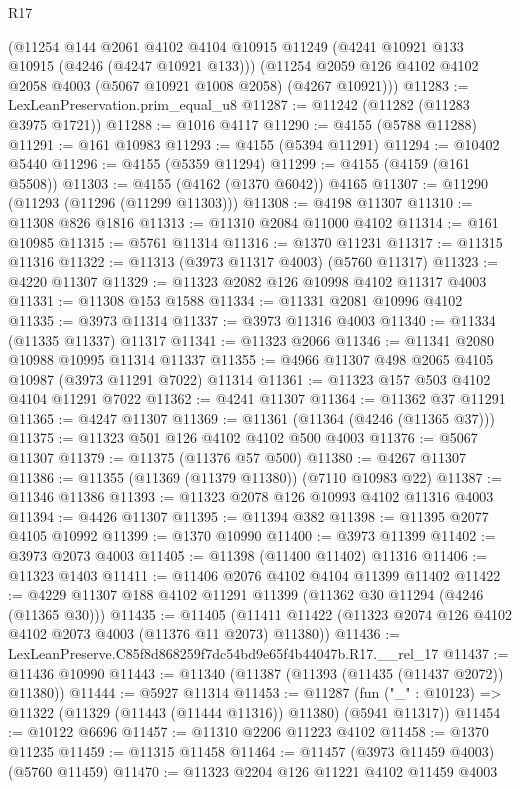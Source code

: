 \begin{lexlean}{R17}
\begin{coremodule}
    (@11254
      @144
      @2061
      @4102
      @4104
      @10915
      @11249
      (@4241 @10921 @133 @10915 (@4246 (@4247 @10921 @133)))
      (@11254 @2059 @126 @4102 @4102 @2058 @4003 (@5067 @10921 @1008 @2058) (@4267 @10921)))
@11283 := LexLeanPreservation.prim_equal_u8
@11287 := @11242 (@11282 (@11283 @3975 @1721))
@11288 := @1016 @4117
@11290 := @4155 (@5788 @11288)
@11291 := @161 @10983
@11293 := @4155 (@5394 @11291)
@11294 := @10402 @5440
@11296 := @4155 (@5359 @11294)
@11299 := @4155 (@4159 (@161 @5508))
@11303 := @4155 (@4162 (@1370 @6042)) @4165
@11307 := @11290 (@11293 (@11296 (@11299 @11303)))
@11308 := @4198 @11307
@11310 := @11308 @826 @1816
@11313 := @11310 @2084 @11000 @4102
@11314 := @161 @10985
@11315 := @5761 @11314
@11316 := @1370 @11231
@11317 := @11315 @11316
@11322 := @11313 (@3973 @11317 @4003) (@5760 @11317)
@11323 := @4220 @11307
@11329 := @11323 @2082 @126 @10998 @4102 @11317 @4003
@11331 := @11308 @153 @1588
@11334 := @11331 @2081 @10996 @4102
@11335 := @3973 @11314
@11337 := @3973 @11316 @4003
@11340 := @11334 (@11335 @11337) @11317
@11341 := @11323 @2066
@11346 := @11341 @2080 @10988 @10995 @11314 @11337
@11355 := @4966 @11307 @498 @2065 @4105 @10987 (@3973 @11291 @7022) @11314
@11361 := @11323 @157 @503 @4102 @4104 @11291 @7022
@11362 := @4241 @11307
@11364 := @11362 @37 @11291
@11365 := @4247 @11307
@11369 := @11361 (@11364 (@4246 (@11365 @37)))
@11375 := @11323 @501 @126 @4102 @4102 @500 @4003
@11376 := @5067 @11307
@11379 := @11375 (@11376 @57 @500)
@11380 := @4267 @11307
@11386 := @11355 (@11369 (@11379 @11380)) (@7110 @10983 @22)
@11387 := @11346 @11386
@11393 := @11323 @2078 @126 @10993 @4102 @11316 @4003
@11394 := @4426 @11307
@11395 := @11394 @382
@11398 := @11395 @2077 @4105 @10992
@11399 := @1370 @10990
@11400 := @3973 @11399
@11402 := @3973 @2073 @4003
@11405 := @11398 (@11400 @11402) @11316
@11406 := @11323 @1403
@11411 := @11406 @2076 @4102 @4104 @11399 @11402
@11422 := @4229 @11307 @188 @4102 @11291 @11399 (@11362 @30 @11294 (@4246 (@11365 @30)))
@11435 := @11405
    (@11411 @11422 (@11323 @2074 @126 @4102 @4102 @2073 @4003 (@11376 @11 @2073) @11380))
@11436 := LexLeanPreserve.C85f8d868259f7dc54bd9e65f4b44047b.R17.__rel_17
@11437 := @11436 @10990
@11443 := @11340 (@11387 (@11393 (@11435 (@11437 @2072)) @11380))
@11444 := @5927 @11314
@11453 := @11287
    (fun ("_" : @10123) => @11322 (@11329 (@11443 (@11444 @11316)) @11380) (@5941 @11317))
@11454 := @10122 @6696
@11457 := @11310 @2206 @11223 @4102
@11458 := @1370 @11235
@11459 := @11315 @11458
@11464 := @11457 (@3973 @11459 @4003) (@5760 @11459)
@11470 := @11323 @2204 @126 @11221 @4102 @11459 @4003

\end{coremodule}
\end{lexlean}
